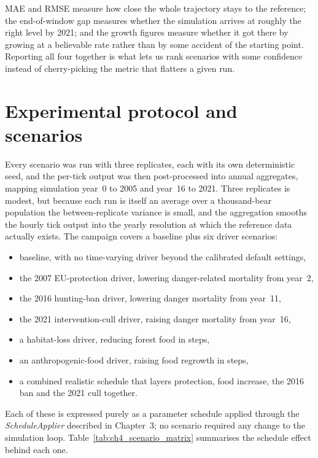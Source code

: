 MAE and RMSE measure how close the whole trajectory stays to the reference; the end-of-window gap measures whether the simulation arrives at roughly the right level by 2021; and the growth figures measure whether it got there by growing at a believable rate rather than by some accident of the starting point. Reporting all four together is what lets us rank scenarios with some confidence instead of cherry-picking the metric that flatters a given run.

\section{Experimental protocol and scenarios}

Every scenario was run with three replicates, each with its own deterministic seed, and the per-tick output was then post-processed into annual aggregates, mapping simulation year~0 to 2005 and year~16 to 2021. Three replicates is modest, but because each run is itself an average over a thousand-bear population the between-replicate variance is small, and the aggregation smooths the hourly tick output into the yearly resolution at which the reference data actually exists. The campaign covers a baseline plus six driver scenarios:

\begin{itemize}
    \item baseline, with no time-varying driver beyond the calibrated default settings,
    \item the 2007 EU-protection driver, lowering danger-related mortality from year~2,
    \item the 2016 hunting-ban driver, lowering danger mortality from year~11,
    \item the 2021 intervention-cull driver, raising danger mortality from year~16,
    \item a habitat-loss driver, reducing forest food in steps,
    \item an anthropogenic-food driver, raising food regrowth in steps,
    \item a combined realistic schedule that layers protection, food increase, the 2016 ban and the 2021 cull together.
\end{itemize}

Each of these is expressed purely as a parameter schedule applied through the \emph{ScheduleApplier} described in Chapter~3; no scenario required any change to the simulation loop. Table~\ref{tab:ch4_scenario_matrix} summarises the schedule effect behind each one.

